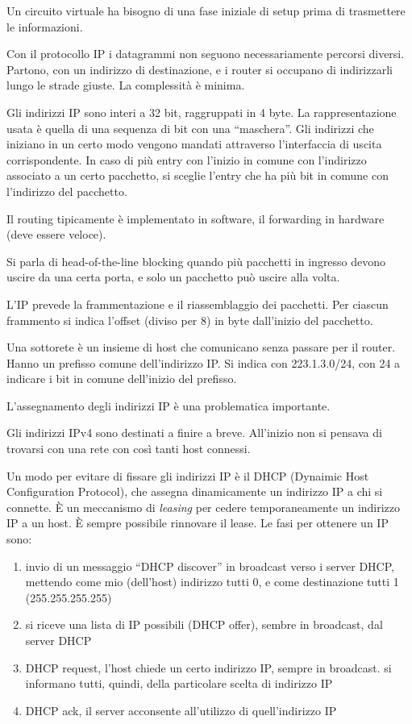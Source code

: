 Un circuito virtuale ha bisogno di una fase iniziale di setup prima di trasmettere le informazioni.

Con il protocollo IP i datagrammi non seguono necessariamente percorsi diversi. Partono, con un indirizzo di destinazione, e i router si occupano di indirizzarli lungo le strade giuste. La complessit\`a \`e minima.

Gli indirizzi IP sono interi a 32 bit, raggruppati in 4 byte. La rappresentazione usata \`e quella di una sequenza di bit con una ``maschera''. Gli indirizzi che iniziano in un certo modo vengono mandati attraverso l'interfaccia di uscita corrispondente. In caso di pi\`u entry con l'inizio in comune con l'indirizzo associato a un certo pacchetto, si sceglie l'entry che ha pi\`u bit in comune con l'indirizzo del pacchetto.

Il routing tipicamente \`e implementato in software, il forwarding in hardware (deve essere veloce).

Si parla di head-of-the-line blocking quando più pacchetti in ingresso devono uscire da una certa porta, e solo un pacchetto pu\`o uscire alla volta.

L'IP prevede la frammentazione e il riassemblaggio dei pacchetti. Per ciascun frammento si indica l'offset (diviso per 8) in byte dall'inizio del pacchetto.

Una sottorete \`e un insieme di host che comunicano senza passare per il router. Hanno un prefisso comune dell'indirizzo IP. Si indica con 223.1.3.0/24, con 24 a indicare i bit in comune dell'inizio del prefisso.

L'assegnamento degli indirizzi IP \`e una problematica importante.

Gli indirizzi IPv4 sono destinati a finire a breve. All'inizio non si pensava di trovarsi con una rete con cos\`i tanti host connessi.

Un modo per evitare di fissare gli indirizzi IP \`e il DHCP (Dynaimic Host Configuration Protocol), che assegna dinamicamente un indirizzo IP a chi si connette. \`E un meccanismo di \emph{leasing} per cedere temporaneamente un indirizzo IP a un host. \`E sempre possibile rinnovare il lease. Le fasi per ottenere un IP sono:
\begin{enumerate}
    \item invio di un messaggio ``DHCP discover'' in broadcast verso i server DHCP, mettendo come mio (dell'host) indirizzo tutti 0, e come destinazione tutti 1 (255.255.255.255)
    \item si riceve una lista di IP possibili (DHCP offer), sembre in broadcast, dal server DHCP
    \item DHCP request, l'host chiede un certo indirizzo IP, sempre in broadcast. si informano tutti, quindi, della particolare scelta di indirizzo IP
    \item DHCP ack, il server acconsente all'utilizzo di quell'indirizzo IP
\end{enumerate}

